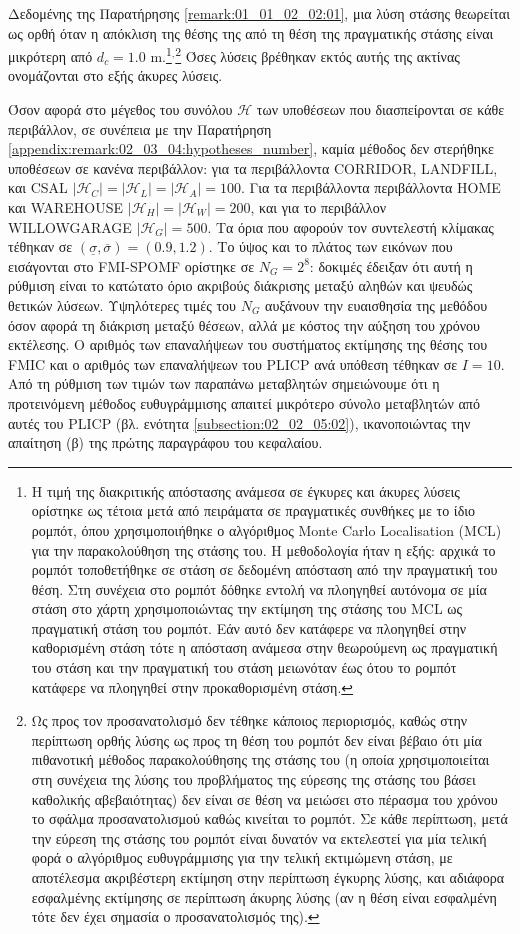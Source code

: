 Δεδομένης της Παρατήρησης \ref{remark:01_01_02_02:01}, μια λύση στάσης
θεωρείται ως ορθή όταν η απόκλιση της θέσης της από τη θέση της πραγματικής
στάσης είναι μικρότερη από $d_c = 1.0$ m.\footnote{Η τιμή της διακριτικής
απόστασης ανάμεσα σε έγκυρες και άκυρες λύσεις ορίστηκε ως τέτοια μετά από
πειράματα σε πραγματικές συνθήκες με το ίδιο ρομπότ, όπου χρησιμοποιήθηκε ο
αλγόριθμος Monte Carlo Localisation (MCL) για την παρακολούθηση της στάσης του.
Η μεθοδολογία ήταν η εξής: αρχικά το ρομπότ τοποθετήθηκε σε στάση σε δεδομένη
απόσταση από την πραγματική του θέση. Στη συνέχεια στο ρομπότ δόθηκε εντολή να
πλοηγηθεί αυτόνομα σε μία στάση στο χάρτη χρησιμοποιώντας την εκτίμηση της
στάσης του MCL ως πραγματική στάση του ρομπότ. Εάν αυτό δεν κατάφερε να
πλοηγηθεί στην καθορισμένη στάση τότε η απόσταση ανάμεσα στην θεωρούμενη ως
πραγματική του στάση και την πραγματική του στάση μειωνόταν έως ότου το ρομπότ
κατάφερε να πλοηγηθεί στην προκαθορισμένη στάση.}$^,$\footnote{Ως προς τον
προσανατολισμό δεν τέθηκε κάποιος περιορισμός, καθώς στην περίπτωση ορθής λύσης
ως προς τη θέση του ρομπότ δεν είναι βέβαιο ότι μία πιθανοτική μέθοδος
παρακολούθησης της στάσης του (η οποία χρησιμοποιείται στη συνέχεια της λύσης
του προβλήματος της εύρεσης της στάσης του βάσει καθολικής αβεβαιότητας) δεν
είναι σε θέση να μειώσει στο πέρασμα του χρόνου το σφάλμα προσανατολισμού καθώς
κινείται το ρομπότ. Σε κάθε περίπτωση, μετά την εύρεση της στάσης του ρομπότ
είναι δυνατόν να εκτελεστεί για μία τελική φορά ο αλγόριθμος ευθυγράμμισης για
την τελική εκτιμώμενη στάση, με αποτέλεσμα ακριβέστερη εκτίμηση στην περίπτωση
έγκυρης λύσης, και αδιάφορα εσφαλμένης εκτίμησης σε περίπτωση άκυρης λύσης (αν
η θέση είναι εσφαλμένη τότε δεν έχει σημασία ο προσανατολισμός της).} Όσες
λύσεις βρέθηκαν εκτός αυτής της ακτίνας ονομάζονται στο εξής άκυρες λύσεις.

Όσον αφορά στο μέγεθος του συνόλου $\mathcal{H}$ των υποθέσεων που
διασπείρονται σε κάθε περιβάλλον, σε συνέπεια με την Παρατήρηση
\ref{appendix:remark:02_03_04:hypotheses_number}, καμία μέθοδος δεν στερήθηκε
υποθέσεων σε κανένα περιβάλλον: για τα περιβάλλοντα CORRIDOR, LANDFILL, και
CSAL $|\mathcal{H}_C| = |\mathcal{H}_L| = |\mathcal{H}_A| = 100$. Για τα
περιβάλλοντα περιβάλλοντα HOME και WAREHOUSE $|\mathcal{H}_H| = |\mathcal{H}_W|
= 200$, και για το περιβάλλον WILLOWGARAGE $|\mathcal{H}_G| = 500$.  Τα όρια
που αφορούν τον συντελεστή κλίμακας τέθηκαν σε $(\underline{\sigma},
\overline{\sigma}) = (0.9, 1.2)$. Το ύψος και το πλάτος των εικόνων που
εισάγονται στο FMI-SPOMF ορίστηκε σε $N_G = 2^8$: δοκιμές έδειξαν ότι αυτή η
ρύθμιση είναι το κατώτατο όριο ακριβούς διάκρισης μεταξύ αληθών και ψευδώς
θετικών λύσεων. Υψηλότερες τιμές του $N_G$ αυξάνουν την ευαισθησία της μεθόδου
όσον αφορά τη διάκριση μεταξύ θέσεων, αλλά με κόστος την αύξηση του χρόνου
εκτέλεσης. Ο αριθμός των επαναλήψεων του συστήματος εκτίμησης της θέσης του
FMIC και ο αριθμός των επαναλήψεων του PLICP ανά υπόθεση τέθηκαν σε $I = 10$.
Από τη ρύθμιση των τιμών των παραπάνω μεταβλητών σημειώνουμε ότι η προτεινόμενη
μέθοδος ευθυγράμμισης απαιτεί μικρότερο σύνολο μεταβλητών από αυτές του
PLICP (βλ. ενότητα \ref{subsection:02_02_05:02}), ικανοποιώντας την απαίτηση
(β) της πρώτης παραγράφου του κεφαλαίου.

